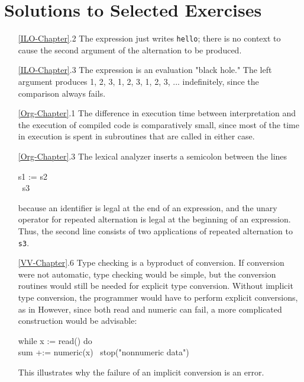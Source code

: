 \chapter{Solutions to Selected Exercises}

\begin{itemize}
\item[\ref*{ILO-Chapter}.2]
The expression
just writes \texttt{hello}; there is no context to cause the second argument of the
alternation to be produced.

\goodbreak\item[\ref*{ILO-Chapter}.3]
The expression
is an evaluation "black hole." The left argument produces 1, 2, 3, 1, 2, 3,
1, 2, 3, ... indefinitely, since the comparison always fails.

\goodbreak\item[\ref*{Org-Chapter}.1]
The difference in execution time between interpretation and the execution
of compiled code is comparatively small, since most of the time in execution is spent
in subroutines that are called in either case.

\goodbreak\item[\ref*{Org-Chapter}.3]
The lexical analyzer inserts a semicolon between the lines
\begin{iconcode}
s1 := s2\\
\textbar\textbar\ s3
\end{iconcode}
because an identifier is legal at the end of an expression, and the unary
operator for repeated alternation is legal at the beginning of an expression. 
Thus, the second line consists of two applications of repeated alternation to \texttt{s3}.

\goodbreak\item[\ref*{VV-Chapter}.6]
Type checking is a byproduct of conversion. If conversion were not
automatic, type checking would be simple, but the conversion routines
would still be needed for explicit type conversion. Without implicit type
conversion, the programmer would have to perform explicit conversions,
as in
However, since both read and numeric can fail, a more complicated construction
would be advisable:
\begin{iconcode}
while x := read() do\\
\>sum +:= numeric(x) \textbar\ stop("nonnumeric data")
\end{iconcode}
This illustrates why the failure of an implicit conversion is an error.


\end{itemize}
